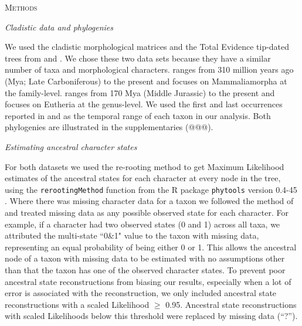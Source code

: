 \documentclass[12pt,letterpaper]{article}
\renewcommand{\section}[1]{%
\bigskip
\begin{center}
\begin{Large}
\normalfont\scshape #1
\medskip
\end{Large}
\end{center}}
\renewcommand{\subsection}[1]{%
\bigskip
\begin{center}
\begin{large}
\normalfont\itshape #1
\end{large}
\end{center}}
\begin{document}
%
%

\section{Methods}

\subsection{Cladistic data and phylogenies}
We used the cladistic morphological matrices and the Total Evidence tip-dated trees \citep{ronquista2012} from \citet[][103 taxa with 446 morphological characters]{Slater2012MEE} and \citet[][102 taxa with 421 morphological characters]{beckancient2014}.
We chose these two data sets because they have a similar number of taxa and morphological characters.
\cite{Slater2012MEE} ranges from 310 million years ago (Mya; Late Carboniferous) to the present and focuses on Mammaliamorpha at the family-level.
\cite{beckancient2014} ranges from 170 Mya (Middle Jurassic) to the present and focuses on Eutheria at the genus-level.
We used the first and last occurrences reported in \cite{Slater2012MEE} and \cite{beckancient2014} as the temporal range of each taxon in our analysis.
Both phylogenies are illustrated in the supplementaries (@@@).

\subsection{Estimating ancestral character states}
For both datasets we used the re-rooting method \citep{Yang01121995,Garland2000} to get Maximum Likelihood estimates of the ancestral states for each character at every node in the tree, using the \texttt{rerootingMethod} function from the R package \texttt{phytools} version 0.4-45 \citep{phytools,R}.
Where there was missing character data for a taxon we followed the method of \cite{Claddis} and treated  missing data as any possible observed state for each character.
For example, if a character had two observed states (0 and 1) across all taxa, we attributed the multi-state ``0\&1" value to the taxon with missing data, representing an equal probability of being either 0 or 1.
This allows the ancestral node of a taxon with missing data to be estimated with no assumptions other than that the taxon has one of the observed character states.
To prevent poor ancestral state reconstructions from biasing our results, especially when a lot of error is associated with the reconstruction, we only included ancestral state reconstructions with a scaled Likelihood $\geq$ 0.95.
Ancestral state reconstructions with scaled Likelihoods below this threshold were replaced by missing data (``?'').
\end{document}
